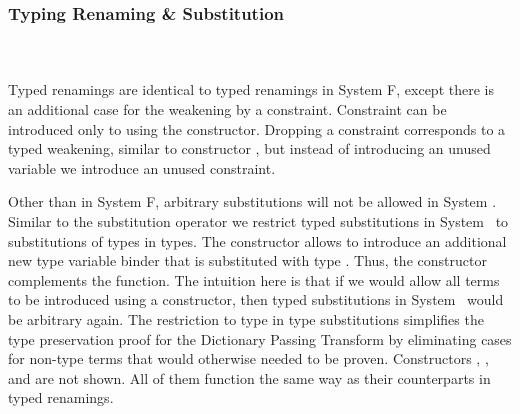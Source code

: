 \subsubsection{Typing Renaming \& Substitution}\hfill\\\\
Typed renamings are identical to typed renamings in System F, except there is an additional case for the weakening by a constraint. 
\FoRenTyping
Constraint  \Constr{:}  can be introduced only to  using the  constructor. 
Dropping a constraint corresponds to a typed weakening, similar to constructor , but instead of introducing an unused variable we introduce an unused constraint.

\noindent Other than in System F, arbitrary substitutions will not be allowed in System \Fo. 
Similar to the substitution operator we restrict typed substitutions in System \Fo\ to substitutions of types in types. 
\FoSubTyping
\noindent The constructor  allows to introduce an additional new type variable binder that is substituted with type .
Thus, the constructor  complements the  function. 
The intuition here is that if we would allow all terms to be introduced using a  constructor, then typed substitutions in System \Fo\ would be arbitrary again. 
The restriction to type in type substitutions simplifies the type preservation proof for the Dictionary Passing Transform by eliminating cases for non-type terms that would otherwise needed to be proven.
Constructors  , ,  and  are not shown. All of them function the same way as their counterparts in typed renamings.